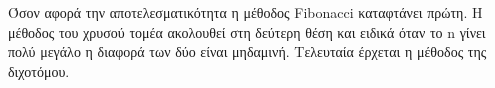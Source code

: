 Όσον αφορά την αποτελεσματικότητα η μέθοδος Fibonacci
καταφτάνει πρώτη. Η μέθοδος του χρυσού τομέα ακολουθεί στη δεύτερη θέση και ειδικά όταν το 
n γίνει πολύ μεγάλο η διαφορά των δύο είναι μηδαμινή.
Τελευταία έρχεται η μέθοδος της διχοτόμου.